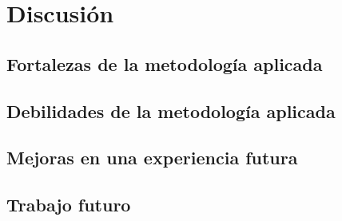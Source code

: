 \chapter{Discusión}


\section{Fortalezas de la metodología aplicada}

\section{Debilidades de la metodología aplicada}

\section{Mejoras en una experiencia futura}

\section{Trabajo futuro}



